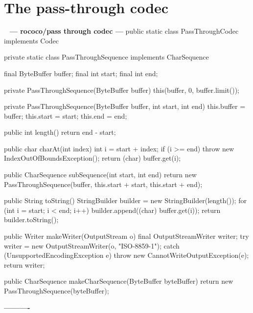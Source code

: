 \documentclass{book}
\newenvironment{chunk}[1]{%
{\ }\newline\noindent%
\hbox{\hskip 2.0cm}{\bf --- #1 ---}%
\verbatim}%                               say exactly what we see
{\endverbatim%
\par{}%
\noindent{}%
\hbox{\hskip 2.0cm}{\bf ----------}%
\par%
\normalsize\noindent}%
\begin{document}
\section{The pass-through codec}
\begin{chunk}{rococo/pass through codec}
public static class PassThroughCodec implements Codec {
    private static class PassThroughSequence implements CharSequence {
        final ByteBuffer buffer;
        final int start;
        final int end;

        private PassThroughSequence(ByteBuffer buffer) {
            this(buffer, 0, buffer.limit());
        }

        private PassThroughSequence(ByteBuffer buffer, int start, int end) {
            this.buffer = buffer;
            this.start = start;
            this.end = end;
        }

        public int length() {
            return end - start;
        }

        public char charAt(int index) {
            int i = start + index;
            if (i >= end) {
                throw new IndexOutOfBoundsException();
            }
            return (char) buffer.get(i);
        }

        public CharSequence subSequence(int start, int end) {
            return new PassThroughSequence(buffer, this.start + start, this.start + end);
        }

        public String toString() {
            StringBuilder builder = new StringBuilder(length());
            for (int i = start; i < end; i++) {
                builder.append((char) buffer.get(i));
            }
            return builder.toString();
        }
    }

    public Writer makeWriter(OutputStream o) {
        final OutputStreamWriter writer;
        try {
            writer = new OutputStreamWriter(o, "ISO-8859-1");
        } catch (UnsupportedEncodingException e) {
            throw new CannotWriteOutputException(e);
        }
        return writer;
    }

    public CharSequence makeCharSequence(ByteBuffer byteBuffer) {
        return new PassThroughSequence(byteBuffer);
    }
}
\end{chunk}
\end{document}
